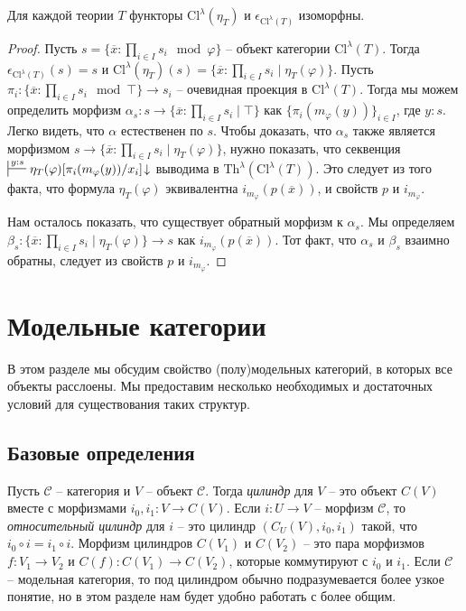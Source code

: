 \documentclass[reqno]{amsart}
\theoremstyle{definition}
\theoremstyle{remark}
\newcommand{\cat}[1]{\mathcal{#1}}
\renewcommand{\C}{\cat{C}}
\newcommand{\fs}[1]{\mathrm{#1}}
\newcommand{\cyli}{i}
\begin{document}
\begin{lem}[th-cl]
Для каждой теории $T$ функторы $\fs{Cl}^\lambda(\eta_T)$ и $\epsilon_{\fs{Cl}^\lambda(T)}$ изоморфны.
\end{lem}
\begin{proof}
Пусть $s = \{ \overline{x} : \prod_{i \in I} s_i \mod \varphi \}$ -- объект категории $\fs{Cl}^\lambda(T)$.
Тогда $\epsilon_{\fs{Cl}^\lambda(T)}(s) = s$ и $\fs{Cl}^\lambda(\eta_T)(s) = \{ \overline{x} : \prod_{i \in I} s_i \mid \eta_T(\varphi) \}$.
Пусть $\pi_i : \{ \overline{x} : \prod_{i \in I} s_i \mod \top \} \to s_i$ -- очевидная проекция в $\fs{Cl}^\lambda(T)$.
Тогда мы можем определить морфизм $\alpha_s : s \to \{ \overline{x} : \prod_{i \in I} s_i \mid \top \}$ как $\{ \pi_i(m_\varphi(y)) \}_{i \in I}$, где $y : s$.
Легко видеть, что $\alpha$ естественен по $s$.
Чтобы доказать, что $\alpha_s$ также является морфизмом $s \to \{ \overline{x} : \prod_{i \in I} s_i \mid \eta_T(\varphi) \}$,
нужно показать, что секвенция $\sststile{}{y : s} \eta_T(\varphi)[\pi_i(m_\varphi(y))/x_i]\!\downarrow$ выводима в $\fs{Th}^\lambda(\fs{Cl}^\lambda(T))$.
Это следует из того факта, что формула $\eta_T(\varphi)$ эквивалентна $i_{m_\varphi}(p(\overline{x}))$, и свойств $p$ и $i_{m_\varphi}$.

Нам осталось показать, что существует обратный морфизм к $\alpha_s$.
Мы определяем $\beta_s : \{ \overline{x} : \prod_{i \in I} s_i \mid \eta_T(\varphi) \} \to s$ как $i_{m_\varphi}(p(\overline{x}))$.
Тот факт, что $\alpha_s$ и $\beta_s$ взаимно обратны, следует из свойств $p$ и $i_{m_\varphi}$.
\end{proof}

\section{Модельные категории}

В этом разделе мы обсудим свойство (полу)модельных категорий, в которых все объекты расслоены.
Мы предоставим несколько необходимых и достаточных условий для существования таких структур.

\subsection{Базовые определения}

Пусть $\C$ -- категория и $V$ -- объект $\C$.
Тогда \emph{цилиндр} для $V$ -- это объект $C(V)$ вместе с морфизмами $\cyli_0,\cyli_1 : V \to C(V)$.
Если $i : U \to V$ -- морфизм $\C$, то \emph{относительный цилиндр} для $i$ -- это цилиндр $(C_U(V),\cyli_0,\cyli_1)$ такой, что $\cyli_0 \circ i = \cyli_1 \circ i$.
Морфизм цилиндров $C(V_1)$ и $C(V_2)$ -- это пара морфизмов $f : V_1 \to V_2$ и $C(f) : C(V_1) \to C(V_2)$, которые коммутируют с $\cyli_0$ и $\cyli_1$.
Если $\C$ -- модельная категория, то под цилиндром обычно подразумевается более узкое понятие, но в этом разделе нам будет удобно работать с более общим.
\end{document}
